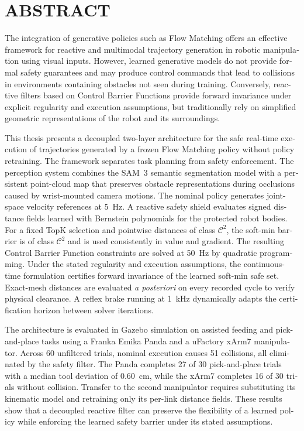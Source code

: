 \chapter*{ABSTRACT}\thispagestyle{headings}
%
\begin{otherlanguage}{english}

The integration of generative policies such as Flow Matching offers an effective framework for reactive and multimodal trajectory generation in robotic manipulation using visual inputs. However, learned generative models do not provide formal safety guarantees and may produce control commands that lead to collisions in environments containing obstacles not seen during training. Conversely, reactive filters based on Control Barrier Functions provide forward invariance under explicit regularity and execution assumptions, but traditionally rely on simplified geometric representations of the robot and its surroundings.

This thesis presents a decoupled two-layer architecture for the safe real-time execution of trajectories generated by a frozen Flow Matching policy without policy retraining. The framework separates task planning from safety enforcement. The perception system combines the SAM~3 semantic segmentation model with a persistent point-cloud map that preserves obstacle representations during occlusions caused by wrist-mounted camera motions. The nominal policy generates joint-space velocity references at 5~Hz. A reactive safety shield evaluates signed distance fields learned with Bernstein polynomials for the protected robot bodies. For a fixed TopK selection and pointwise distances of class $\mathcal{C}^2$, the soft-min barrier is of class $\mathcal{C}^2$ and is used consistently in value and gradient. The resulting Control Barrier Function constraints are solved at 50~Hz by quadratic programming. Under the stated regularity and execution assumptions, the continuous-time formulation certifies forward invariance of the learned soft-min safe set. Exact-mesh distances are evaluated \textit{a posteriori} on every recorded cycle to verify physical clearance. A reflex brake running at 1~kHz dynamically adapts the certification horizon between solver iterations.

The architecture is evaluated in Gazebo simulation on assisted feeding and pick-and-place tasks using a Franka Emika Panda and a uFactory xArm7 manipulator. Across 60 unfiltered trials, nominal execution causes 51 collisions, all eliminated by the safety filter. The Panda completes 27 of 30 pick-and-place trials with a median tool deviation of 0.60~cm, while the xArm7 completes 16 of 30 trials without collision. Transfer to the second manipulator requires substituting its kinematic model and retraining only its per-link distance fields. These results show that a decoupled reactive filter can preserve the flexibility of a learned policy while enforcing the learned safety barrier under its stated assumptions.

\end{otherlanguage}
